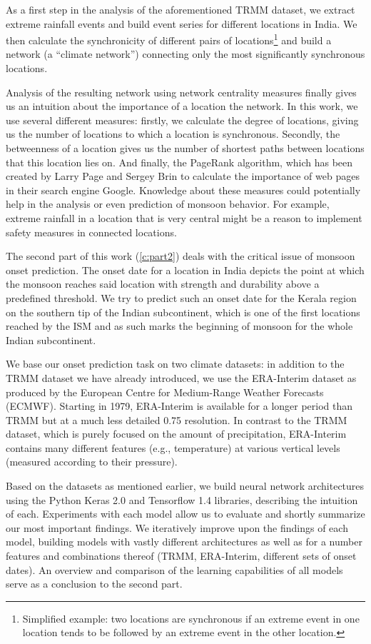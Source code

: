 As a first step in the analysis of the aforementioned TRMM dataset, we extract extreme rainfall events and build event series for different locations in India. We then calculate the synchronicity of different pairs of locations\footnote{Simplified example: two locations are synchronous if an extreme event in one location tends to be followed by an extreme event in the other location.} and build a network (a ``climate network'') connecting only the most significantly synchronous locations.

Analysis of the resulting network using network centrality measures finally gives us an intuition about the importance of a location the network. In this work, we use several different measures: firstly, we calculate the degree of locations, giving us the number of locations to which a location is synchronous. Secondly, the betweenness of a location gives us the number of shortest paths between locations that this location lies on. And finally, the PageRank algorithm, which has been created by Larry Page and Sergey Brin to calculate the importance of web pages in their search engine Google. Knowledge about these measures could potentially help in the analysis or even prediction of monsoon behavior. For example, extreme rainfall in a location that is very central might be a reason to implement safety measures in connected locations.

The second part of this work (\cref{c:part2}) deals with the critical issue of monsoon onset prediction. The onset date for a location in India depicts the point at which the monsoon reaches said location with strength and durability above a predefined threshold. We try to predict such an onset date for the Kerala region on the southern tip of the Indian subcontinent, which is one of the first locations reached by the ISM and as such marks the beginning of monsoon for the whole Indian subcontinent.

We base our onset prediction task on two climate datasets: in addition to the TRMM dataset we have already introduced, we use the ERA-Interim dataset as produced by the European Centre for Medium-Range Weather Forecasts (ECMWF). Starting in 1979, ERA-Interim is available for a longer period than TRMM but at a much less detailed {0.75\degree} resolution. In contrast to the TRMM dataset, which is purely focused on the amount of precipitation, ERA-Interim contains many different features (e.g., temperature) at various vertical levels (measured according to their pressure).

Based on the datasets as mentioned earlier, we build neural network architectures using the Python Keras 2.0 and Tensorflow 1.4 libraries, describing the intuition of each. Experiments with each model allow us to evaluate and shortly summarize our most important findings. We iteratively improve upon the findings of each model, building models with vastly different architectures as well as for a number features and combinations thereof (TRMM, ERA-Interim, different sets of onset dates). An overview and comparison of the learning capabilities of all models serve as a conclusion to the second part.

